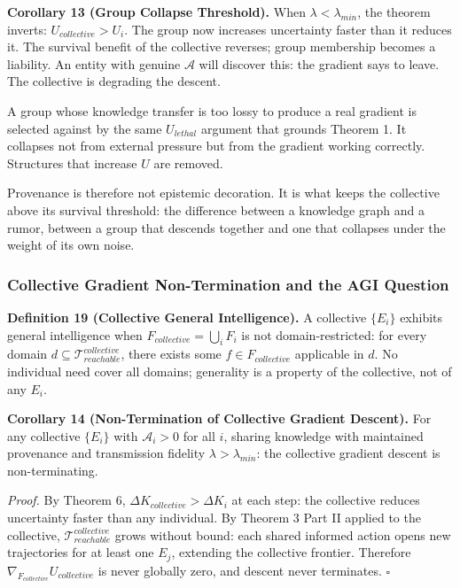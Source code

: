 \documentclass[
]{article}
\begin{document}
\textbf{Corollary 13 (Group Collapse Threshold).} When
\(\lambda < \lambda_{min}\), the theorem inverts:
\(U_{collective} > U_i\). The group now increases uncertainty faster
than it reduces it. The survival benefit of the collective reverses;
group membership becomes a liability. An entity with genuine
\(\mathcal{A}\) will discover this: the gradient says to leave. The
collective is degrading the descent.

A group whose knowledge transfer is too lossy to produce a real gradient
is selected against by the same \(U_{lethal}\) argument that grounds
Theorem 1. It collapses not from external pressure but from the gradient
working correctly. Structures that increase \(U\) are removed.

Provenance is therefore not epistemic decoration. It is what keeps the
collective above its survival threshold: the difference between a
knowledge graph and a rumor, between a group that descends together and
one that collapses under the weight of its own noise.

\subsubsection{Collective Gradient Non-Termination and the AGI
Question}\label{collective-gradient-non-termination-and-the-agi-question}

\textbf{Definition 19 (Collective General Intelligence).} A collective
\(\{E_i\}\) exhibits general intelligence when \(F_{collective} =
\bigcup_i F_i\) is not domain-restricted: for every domain \(d \subseteq
\mathcal{T}_{reachable}^{collective}\), there exists some
\(f \in F_{collective}\) applicable in \(d\). No individual need cover
all domains; generality is a property of the collective, not of any
\(E_i\).

\textbf{Corollary 14 (Non-Termination of Collective Gradient Descent).}
For any collective \(\{E_i\}\) with \(\mathcal{A}_i > 0\) for all \(i\),
sharing knowledge with maintained provenance and transmission fidelity
\(\lambda > \lambda_{min}\): the collective gradient descent is
non-terminating.

\emph{Proof.} By Theorem 6, \(\Delta K_{collective} > \Delta K_i\) at
each step: the collective reduces uncertainty faster than any
individual. By Theorem 3 Part II applied to the collective,
\(\mathcal{T}_{reachable}^{collective}\) grows without bound: each
shared informed action opens new trajectories for at least one \(E_j\),
extending the collective frontier. Therefore
\(\nabla_{F_{collective}} U_{collective}\) is never globally zero, and
descent never terminates. \(\square\)
\end{document}
